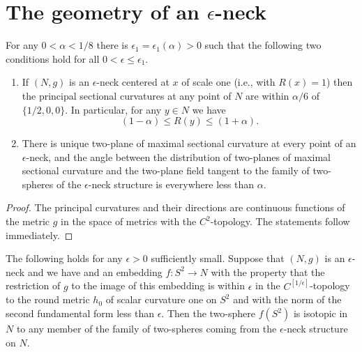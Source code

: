 \section{The geometry of an $\epsilon$-neck}


\begin{lemma}
\label{lem:epsilon-neck-curvature-pinching}
\label{neckcurv}
For any $0<\alpha<1/8$  there is $\epsilon_1=\epsilon_1(\alpha)>0$ such that
the following two conditions hold for all $0<\epsilon\le \epsilon_1$.
\begin{enumerate} \item[(1)] If $(N,g)$ is an $\epsilon$-neck centered at $x$ of
scale one (i.e., with $R(x)=1$) then the principal sectional
curvatures at any point of $N$ are within $\alpha/6$ of
$\{1/2,0,0\}$. In particular, for any $y\in N$ we have
$$(1-\alpha)\le R(y)\le (1+\alpha).$$
\item[(2)] There is unique two-plane of maximal sectional curvature at
every point of an $\epsilon$-neck, and the angle between the
distribution of two-planes of maximal sectional curvature and the
two-plane field tangent to the family of two-spheres of the
$\epsilon$-neck structure is everywhere less than $\alpha$.
\end{enumerate}
\end{lemma}

\begin{proof}
The principal curvatures and their directions are continuous
functions of the metric $g$ in the space of metrics with the
$C^2$-topology. The statements follow immediately.
\end{proof}


\begin{corollary}
\label{cor:embedded-sphere-isotopic-to-neck-fiber}
\label{s2isotopic}
The following holds for any $\epsilon>0$ sufficiently small. Suppose
that $(N,g)$ is an $\epsilon$-neck and we have  and an embedding
$f\colon S^2 \to N$ with the property that the restriction of $g$ to
the image of this embedding is within $\epsilon$ in the
$C^{[1/\epsilon]}$-topology to the round metric $h_0$ of scalar
curvature one on $S^2$ and with the norm of the second fundamental
form less than $\epsilon$. Then the two-sphere $f(S^2)$ is isotopic
in $N$ to any member of the family of two-spheres coming from the
$\epsilon$-neck structure on $N$.
\end{corollary}



